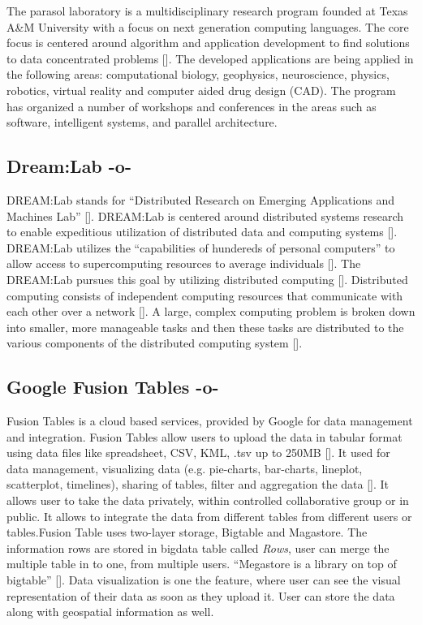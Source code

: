The parasol laboratory is a multidisciplinary research program founded
at Texas A\&M University with a focus on next generation computing
languages.  The core focus is centered around algorithm and
application development to find solutions to data concentrated
problems [\cite{www-parasol}]. The developed applications are being
applied in the following areas: computational biology, geophysics,
neuroscience, physics, robotics, virtual reality and computer aided
drug design (CAD).  The program has organized a number of workshops
and conferences in the areas such as software, intelligent systems,
and parallel architecture.
    
\subsection{Dream:Lab -o-}

DREAM:Lab stands for ``Distributed Research on Emerging Applications
and Machines Lab'' [\cite{dream}]. DREAM:Lab is centered around
distributed systems research to enable expeditious utilization of
distributed data and computing systems [\cite{dream}]. DREAM:Lab
utilizes the ``capabilities of hundereds of personal computers'' to
allow access to supercomputing resources to average
individuals [\cite{rao}]. The DREAM:Lab pursues this goal by utilizing
distributed computing [\cite{rao}].  Distributed computing consists of
independent computing resources that communicate with each other over
a network [\cite{denero}]. A large, complex computing problem is broken
down into smaller, more manageable tasks and then these tasks are
distributed to the various components of the distributed computing
system [\cite{denero}].


    
\subsection{Google Fusion Tables -o-}
    
Fusion Tables is a cloud based services, provided by Google for data
management and integration. Fusion Tables allow users to upload the
data in tabular format using data files like spreadsheet, CSV, KML,
.tsv up to 250MB [\cite{www-FusionTableSupport}]. It used for data
management, visualizing data (e.g. pie-charts, bar-charts, lineplot,
scatterplot, timelines), sharing of tables, filter and aggregation the
data [\cite{wiki-FusionTable}].  It allows user to take the data
privately, within controlled collaborative group or in public. It
allows to integrate the data from different tables from different
users or tables.Fusion Table uses two-layer storage, Bigtable and
Magastore. The information rows are stored in bigdata table called
\textit{Rows}, user can merge the multiple table in to one, from multiple
users. ``Megastore is a library on top of
bigtable'' [\cite{GoogleFusionTable2012}]. Data visualization is one the
feature, where user can see the visual representation of their data as
soon as they upload it. User can store the data along with geospatial
information as well.



